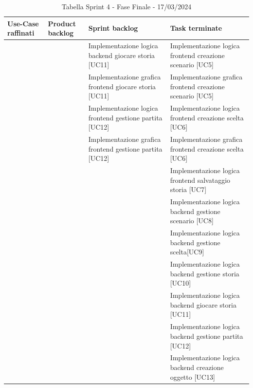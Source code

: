 \documentclass{article}
\begin{document}
\begin{table}[h]
    \centering
    \begin{tabularx}{\textwidth}{|X|X|X|X|}
        \hline
        \bf Use-Case raffinati & \bf Product backlog & \bf Sprint backlog & \bf Task terminate \\
        \hline
        & & Implementazione logica backend giocare storia [UC11] & Implementazione logica frontend creazione scenario [UC5] \\
        \hline
        & & Implementazione grafica frontend giocare storia [UC11] & Implementazione grafica frontend creazione scenario [UC5] \\
        \hline
        & & Implementazione logica frontend gestione partita [UC12] & Implementazione logica frontend creazione scelta [UC6] \\
        \hline
        & & Implementazione grafica frontend gestione partita [UC12] & Implementazione grafica frontend creazione scelta [UC6] \\
        \hline
        & & & Implementazione logica frontend salvataggio storia [UC7] \\
        \hline
        & & & Implementazione logica backend gestione scenario [UC8] \\
        \hline
        & & & Implementazione logica backend gestione scelta[UC9] \\
        \hline
        & & & Implementazione logica backend gestione storia [UC10] \\
        \hline
        & & & Implementazione logica backend giocare storia [UC11] \\
        \hline
        & & & Implementazione logica backend gestione partita [UC12] \\
        \hline
        & & & Implementazione logica backend creazione oggetto [UC13] \\
        \hline
    \end{tabularx}
    \caption*{Tabella Sprint 4 - Fase Finale - 17/03/2024}
\end{table}
\end{document}
